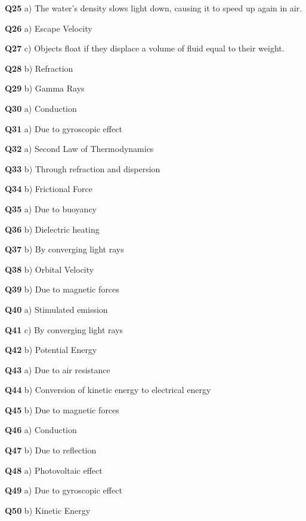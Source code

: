 \textbf{Q25} a) The water's density slows light down, causing it to speed up again in air.\par
\textbf{Q26} a) Escape Velocity\par
\textbf{Q27} c) Objects float if they displace a volume of fluid equal to their weight.\par
\textbf{Q28} b) Refraction\par
\textbf{Q29} b) Gamma Rays\par
\textbf{Q30} a) Conduction\par
\textbf{Q31} a) Due to gyroscopic effect\par
\textbf{Q32} a) Second Law of Thermodynamics\par
\textbf{Q33} b) Through refraction and dispersion\par
\textbf{Q34} b) Frictional Force\par
\textbf{Q35} a) Due to buoyancy\par
\textbf{Q36} b) Dielectric heating\par
\textbf{Q37} b) By converging light rays\par
\textbf{Q38} b) Orbital Velocity\par
\textbf{Q39} b) Due to magnetic forces\par
\textbf{Q40} a) Stimulated emission\par
\textbf{Q41} c) By converging light rays\par
\textbf{Q42} b) Potential Energy\par
\textbf{Q43} a) Due to air resistance\par
\textbf{Q44} b) Conversion of kinetic energy to electrical energy\par
\textbf{Q45} b) Due to magnetic forces\par
\textbf{Q46} a) Conduction\par
\textbf{Q47} b) Due to reflection\par
\textbf{Q48} a) Photovoltaic effect\par
\textbf{Q49} a) Due to gyroscopic effect\par
\textbf{Q50} b) Kinetic Energy\par